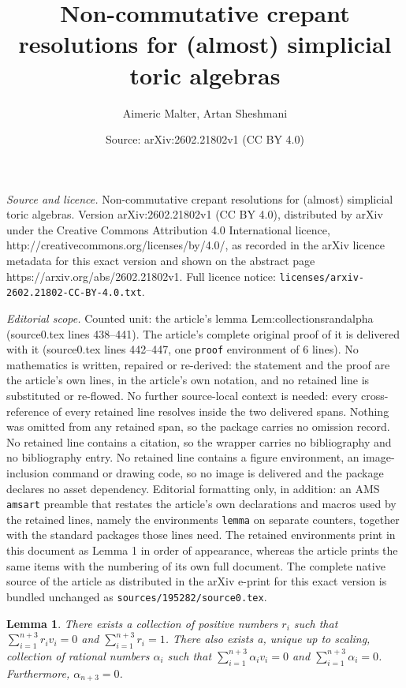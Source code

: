 \documentclass[10pt,a4paper]{amsart}
\title{Non-commutative crepant resolutions for (almost) simplicial toric algebras}
\author{Aimeric Malter, Artan Sheshmani}
\date{Source: arXiv:2602.21802v1 (CC BY 4.0)}
\newtheorem{lemma}{Lemma}
\begin{document}
\maketitle

\noindent\emph{Source and licence.} Non-commutative crepant resolutions for (almost) simplicial toric algebras. Version arXiv:2602.21802v1 (CC BY 4.0), distributed by arXiv under the Creative Commons Attribution 4.0 International licence, http://creativecommons.org/licenses/by/4.0/, as recorded in the arXiv licence metadata for this exact version and shown on the abstract page https://arxiv.org/abs/2602.21802v1. Full licence notice: \texttt{licenses/arxiv-2602.21802-CC-BY-4.0.txt}.\par\smallskip

\noindent\textit{Editorial scope.} Counted unit: the article's lemma Lem:collectionsrandalpha (source0.tex lines 438--441). The article's complete original proof of it is delivered with it (source0.tex lines 442--447, one \texttt{proof} environment of 6 lines). No mathematics is written, repaired or re-derived: the statement and the proof are the article's own lines, in the article's own notation, and no retained line is substituted or re-flowed.  No further source-local context is needed: every cross-reference of every retained line resolves inside the two delivered spans.  Nothing was omitted from any retained span, so the package carries no omission record.  No retained line contains a citation, so the wrapper carries no bibliography and no bibliography entry.  No retained line contains a figure environment, an image-inclusion command or drawing code, so no image is delivered and the package declares no asset dependency.  Editorial formatting only, in addition: an AMS \texttt{amsart} preamble that restates the article's own declarations and macros used by the retained lines, namely the environments \texttt{lemma} on separate counters, together with the standard packages those lines need.  The retained environments print in this document as Lemma 1 in order of appearance, whereas the article prints the same items with the numbering of its own full document.  The complete native source of the article as distributed in the arXiv e-print for this exact version is bundled unchanged as \texttt{sources/195282/source0.tex}.
\begin{lemma}
    \label{Lem:collectionsrandalpha}
    There exists a collection of positive numbers $r_i$ such that $\sum_{i=1}^{n+3}r_i v_i=0$ and $\sum_{i=1}^{n+3}r_i=1$. There also exists a, unique up to scaling, collection of rational numbers $\alpha_i$ such that $\sum_{i=1}^{n+3}\alpha_i v_i=0$ and $\sum_{i=1}^{n+3}\alpha_i=0$. Furthermore, $\alpha_{n+3}=0$. 
\end{lemma}
\end{document}
